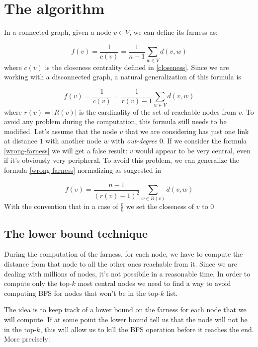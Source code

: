 \section{The algorithm}

In a connected graph, given a node $v \in V$, we can define its farness as:

\begin{equation}
    f(v) = \frac{1}{c(v)} = \frac{1}{n-1} \displaystyle \sum_{w \in V} d(v,w)
\end{equation}
where $c(v)$ is the closeness centrality defined in \eqref{closeness}. Since we are working with a disconnected graph, a natural generalization of this formula is

\begin{equation}\label{wrong-farness}
    f(v) = \frac{1}{c(v)} = \frac{1}{r(v)-1} \displaystyle \sum_{w \in V} d(v,w)
\end{equation}
where $r(v) = |R(v)|$ is the cardinality of the set of reachable nodes from $v$. To avoid any problem during the computation, this formula still needs to be modified. Let's assume that the node $v$ that we are considering has just one link at distance $1$ with another node $w$ with \emph{out-degree} 0. If we consider the formula \eqref{wrong-farness} we will get a false result: $v$ would appear to be very central, even if it's obviously very peripheral. To avoid this problem, we can generalize the formula \eqref{wrong-farness} normalizing as suggested in \cite{wasserman_faust_1994,doi:10.1080/15427951.2013.865686, olsen2014upoa}

\begin{equation}\label{farness}
    f(v) = \frac{n-1}{(r(v)-1)^2} \sum_{w \in R(v)} d(v,w)
\end{equation}
With the convention that in a case of $\frac{0}{0}$ we set the closeness of $v$ to 0

\subsection{The lower bound technique}
During the computation of the farness, for each node, we have to compute the distance from that node to all the other ones reachable from it. Since we are dealing with millions of nodes, it's not possibile in a reasonable time. In order to compute only the top-$k$ most central nodes we need to find a way to avoid computing BFS for nodes that won't be in the top-$k$ list. \s

\noindent The idea is to keep track of a lower bound on the farness for each node that we will compute. If at some point the lower bound tell us that the node will not be in the top-$k$, this will allow us to kill the BFS operation before it reaches the end. More precisely:

